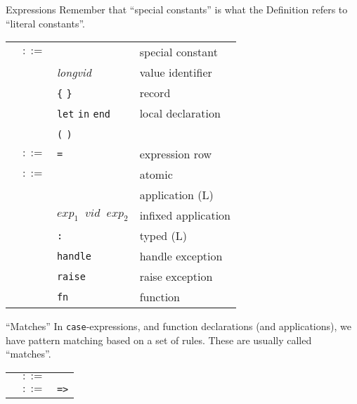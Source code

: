 \begin{grammar}{Expressions}
Remember that ``special constants'' is what the Definition refers to
``literal constants''.
\begin{longtable}{rcll}
\label{grammar:atexp}\nonterminal{atexp} & $::=$ & \nonterminal{scon} & special constant\\
& \alt& \optional{\texttt{op}} \textit{longvid} & value identifier\\
&\alt&\verb+{+ \optional{\textit{exprow}} \verb+}+ & record\\
&\alt&\texttt{let} \hyperref[grammar:dec]{\nonterminal{dec}} \texttt{in} \nonterminal{exp} \texttt{end} & local declaration\\
&\alt&\texttt{(} \nonterminal{exp} \texttt{)} & \\
\label{grammar:exprow}\nonterminal{exprow} & $::=$ & \nonterminal{lab} \texttt{=} \nonterminal{exp} \optional{\texttt{\char`\,} \nonterminal{exprow}}
& expression row\\
\label{grammar:exp}\nonterminal{exp} & $::=$ & \nonterminal{atexp} & atomic\\
&\alt& \nonterminal{exp} \nonterminal{atexp} & application (L)\\
&\alt& $exp_{1}\;\;vid\;\;exp_{2}$ & infixed application\\
&\alt& \nonterminal{exp} \texttt{:} \hyperref[grammar:ty]{\nonterminal{ty}} & typed (L)\\
&\alt& \nonterminal{exp} \texttt{handle} \hyperref[grammar:match]{\nonterminal{match}} & handle exception\\
&\alt&\texttt{raise} \nonterminal{exp} & raise exception\\
&\alt&\texttt{fn} \hyperref[grammar:match]{\nonterminal{match}} & function\\
\end{longtable}
\end{grammar}

\begin{grammar}{``Matches''}
In \texttt{case}-expressions, and function declarations (and
applications), we have pattern matching based on a set of rules. These
are usually called ``matches''.
\begin{longtable}{rcl}
\label{grammar:match}\nonterminal{match} & $::=$ & \nonterminal{mrule} \optional{\texttt{\char`\|} \nonterminal{match}} \\
\label{grammar:mrule}\nonterminal{mrule} & $::=$ & \hyperref[grammar:pat]{\nonterminal{pat}} \texttt{=>} \hyperref[grammar:exp]{\nonterminal{exp}}\\
\end{longtable}
\end{grammar}

